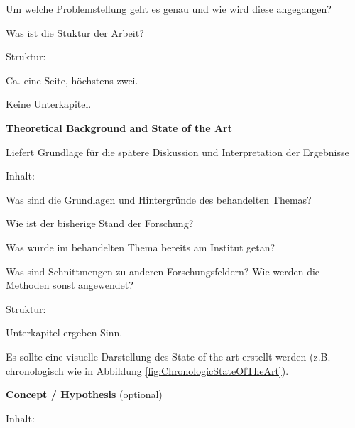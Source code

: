 \begin{enumerate}
\begin{compactitem}
\begin{compactitem}
            \item Um welche Problemstellung geht es genau und wie wird diese angegangen? 
            \item Was ist die Stuktur der Arbeit?
        \end{compactitem}
        \item Struktur:
        \begin{compactitem}
            \item Ca. eine Seite, höchstens zwei.
            \item Keine Unterkapitel.
        \end{compactitem}
    \end{compactitem}
    \item \textbf{Theoretical Background and State of the Art} \vspace{-4 mm}
    \begin{compactitem}
        \item Liefert Grundlage für die spätere Diskussion und Interpretation der Ergebnisse
        \item Inhalt:
        \begin{compactitem}
            \item Was sind die Grundlagen und Hintergründe des behandelten Themas?
            \item Wie ist der bisherige Stand der Forschung?
            \item Was wurde im behandelten Thema bereits am Institut getan?
            \item Was sind Schnittmengen zu anderen Forschungsfeldern? Wie werden die Methoden sonst angewendet?
        \end{compactitem}
        \item Struktur:
        \begin{compactitem}
            \item Unterkapitel ergeben Sinn.
            \item Es sollte eine visuelle Darstellung des State-of-the-art erstellt werden (z.B. chronologisch wie in Abbildung \ref{fig:ChronologicStateOfTheArt}).
        \end{compactitem}
    \end{compactitem}
    \item \textbf{Concept / Hypothesis} (optional) \vspace{-4 mm}
    \begin{compactitem}
        \item Inhalt:
        \begin{compactitem}

\end{compactitem}
\end{compactitem}
\end{enumerate}
